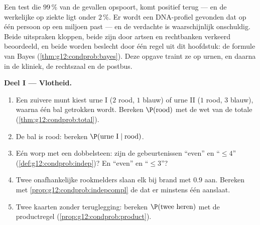 \begin{problem}
\label{pb:g12:condprob:1}
Een test die $99\,\%$ van de gevallen opspoort, komt positief terug --- en de
werkelijke  op ziekte ligt onder $2\,\%$. Er wordt een DNA-profiel
gevonden dat op één persoon op een miljoen past --- en de verdachte is
waarschijnlijk onschuldig. Beide uitspraken kloppen, beide zijn door artsen en
rechtbanken verkeerd beoordeeld, en beide worden beslecht door één regel uit
dit hoofdstuk: de formule van Bayes (\cref{thm:g12:condprob:bayes}). Deze
opgave traint ze op urnen, en daarna in de kliniek, de rechtszaal en de
postbus.

\medskip
\noindent\textbf{Deel I --- Vlotheid.}
\begin{enumerate}
  \item Een zuivere munt kiest urne I ($2$ rood, $1$ blauw) of urne II ($1$
        rood, $3$ blauw), waarna één bal getrokken wordt. Bereken
        $\P(\text{rood})$ met de wet van de totale 
        (\cref{thm:g12:condprob:total}).
  \item De bal is rood: bereken $\P(\text{urne I} \mid \text{rood})$.
  \item Eén worp met een dobbelsteen: zijn de gebeurtenissen ``even'' en
        ``$\leq 4$''  (\cref{def:g12:condprob:indep})? En ``even''
        en ``$\leq 3$''?
  \item Twee onafhankelijke rookmelders slaan elk bij brand met  $0.9$
        aan. Bereken met \cref{prop:g12:condprob:indepcompl} de  dat er
        minstens één aanslaat.
  \item Twee kaarten zonder teruglegging: bereken $\P(\text{twee heren})$ met
        de productregel (\cref{prop:g12:condprob:product}).
\end{enumerate}


\end{problem}

